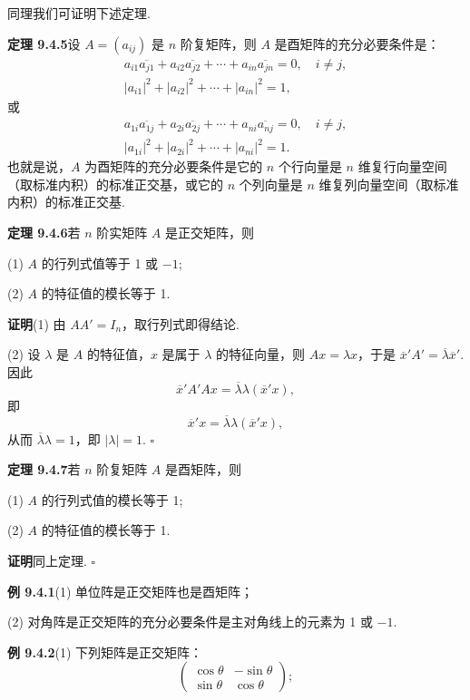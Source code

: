 \documentclass[UTF8, 12pt, fontset=fandol, oneside]{ctexart}
\begin{document}
同理我们可证明下述定理.

\noindent\textbf{定理 9.4.5}\quad 设 $A=(a_{ij})$ 是 $n$ 阶复矩阵，则 $A$ 是酉矩阵的充分必要条件是：
\[
\begin{gathered}
  a_{i1}\overline{a_{j1}}+a_{i2}\overline{a_{j2}}+\cdots+a_{in}\overline{a_{jn}}=0,\quad i\ne j,\\
  |a_{i1}|^2+|a_{i2}|^2+\cdots+|a_{in}|^2=1,
\end{gathered}
\]
或
\[
\begin{gathered}
  a_{1i}\overline{a_{1j}}+a_{2i}\overline{a_{2j}}+\cdots+a_{ni}\overline{a_{nj}}=0,\quad i\ne j,\\
  |a_{1i}|^2+|a_{2i}|^2+\cdots+|a_{ni}|^2=1.
\end{gathered}
\]
也就是说，$A$ 为酉矩阵的充分必要条件是它的 $n$ 个行向量是 $n$ 维复行向量空间（取标准内积）的标准正交基，或它的 $n$ 个列向量是 $n$ 维复列向量空间（取标准内积）的标准正交基.

\noindent\textbf{定理 9.4.6}\quad 若 $n$ 阶实矩阵 $A$ 是正交矩阵，则

(1) $A$ 的行列式值等于 1 或 $-1$;

(2) $A$ 的特征值的模长等于 1.

\noindent\textbf{证明}\quad (1) 由 $AA'=I_n$，取行列式即得结论.

(2) 设 $\lambda$ 是 $A$ 的特征值，$x$ 是属于 $\lambda$ 的特征向量，则 $Ax=\lambda x$，于是 $\overline x'A'=\overline\lambda\overline x'$. 因此
\[
  \overline x'A'Ax=\overline\lambda\lambda(\overline x'x),
\]
即
\[
  \overline x'x=\overline\lambda\lambda(\overline x'x),
\]
从而 $\overline\lambda\lambda=1$，即 $|\lambda|=1$. $\square$

\noindent\textbf{定理 9.4.7}\quad 若 $n$ 阶复矩阵 $A$ 是酉矩阵，则

(1) $A$ 的行列式值的模长等于 1;

(2) $A$ 的特征值的模长等于 1.

\noindent\textbf{证明}\quad 同上定理. $\square$

\noindent\textbf{例 9.4.1}\quad (1) 单位阵是正交矩阵也是酉矩阵；

(2) 对角阵是正交矩阵的充分必要条件是主对角线上的元素为 1 或 $-1$.

\noindent\textbf{例 9.4.2}\quad (1) 下列矩阵是正交矩阵：
\[
  \left(\begin{array}{cc}
    \cos\theta & -\sin\theta\\
    \sin\theta & \cos\theta
  \end{array}\right);
\]
\end{document}
